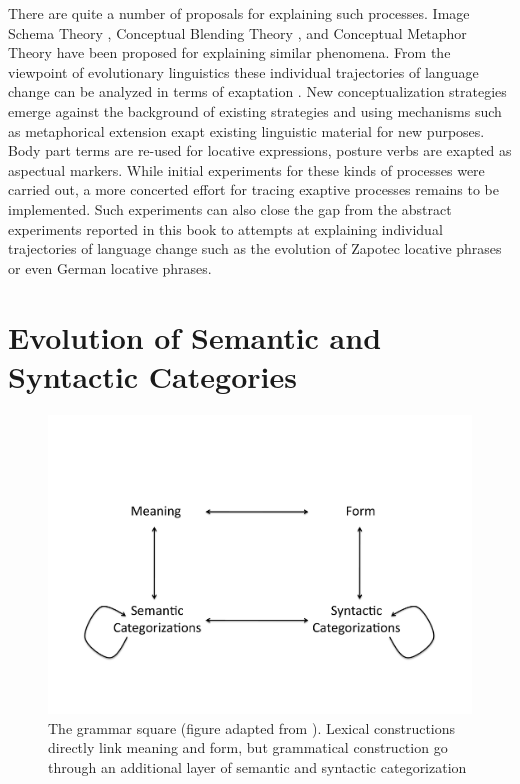 There are quite a number of proposals for explaining such processes. 
Image Schema Theory \citep{johnson1987body}, 
Conceptual Blending Theory \citep{fauconnier1994mental}, and
Conceptual Metaphor Theory \citep{lakoff1980metaphors}
have been proposed for explaining similar phenomena.
From the viewpoint of evolutionary linguistics these individual 
trajectories of language change can be analyzed in terms of exaptation 
\citep{lass1990things,lass1997historical}. New conceptualization strategies emerge 
against the background of existing
strategies and using mechanisms such as metaphorical extension exapt
existing linguistic material for new purposes. Body part terms are re-used
for locative expressions, posture verbs are exapted as aspectual markers.
While initial experiments for these kinds of processes were carried out, a 
more concerted effort for tracing exaptive processes remains to be implemented.
Such experiments can also close the gap from the abstract experiments reported
in this book to attempts at explaining individual trajectories of language change
such as the evolution of Zapotec locative phrases or even German locative phrases.

\section{Evolution of Semantic and Syntactic Categories}
\begin{figure}
\begin{center}
\includegraphics[width=0.7\columnwidth]{figs/grammar-square}
\end{center}
\caption[Grammar square]{The grammar square (figure 
adapted from \citealp{steels2011design}). Lexical constructions directly link meaning
and form, but grammatical construction go through an additional layer of
semantic and syntactic categorization}
\label{f:grammar-square}
\end{figure}


